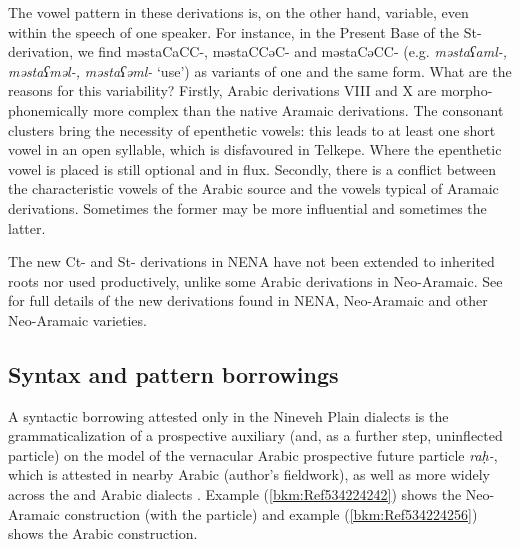 \documentclass[output=paper]{langsci/langscibook}
\begin{document}
The vowel pattern in these derivations is, on the other hand, variable, even within the speech of one speaker. For instance, in the Present Base of the St-{derivation}, we find məstaCaCC-, məstaCCəC- and məstaCəCC- (e.g. \textit{məstaʕaml-,} \textit{məstaʕməl-,} \textit{məstaʕəml-} ‘use’) as variants of one and the same form. What are the reasons for this variability? Firstly, Arabic derivations VIII and X are morpho-phonemically more complex than the native Aramaic derivations. The {consonant clusters} bring the necessity of epenthetic vowels: this leads to at least one short vowel in an open syllable, which is disfavoured in Telkepe. Where the epenthetic vowel is placed is still optional and in flux. Secondly, there is a conflict between the characteristic vowels of the  Arabic source and the vowels typical of Aramaic derivations. Sometimes the former may be more influential and sometimes the latter.

The new Ct- and St- derivations in NENA have not been extended to inherited {roots} nor used productively, unlike some Arabic derivations in  Neo-Aramaic. See \citet{Coghill2015} for full details of the new derivations found in NENA,  Neo-Aramaic and other Neo-Aramaic varieties.

\subsection{\label{bkm:Ref534214095}Syntax and pattern borrowings}

A syntactic borrowing attested only in the  Nineveh Plain dialects is the {grammaticalization} of a {prospective} auxiliary (and, as a further step, uninflected particle) on the model of the vernacular Arabic {prospective} {future} particle \textit{raḥ-}, which is attested in nearby  Arabic (author’s fieldwork), as well as more widely across the  and  Arabic dialects \citep[304]{Jastrow1978}. Example (\ref{bkm:Ref534224242}) shows the Neo-Aramaic construction (with the particle) and example (\ref{bkm:Ref534224256}) shows the Arabic construction.


\end{document}
